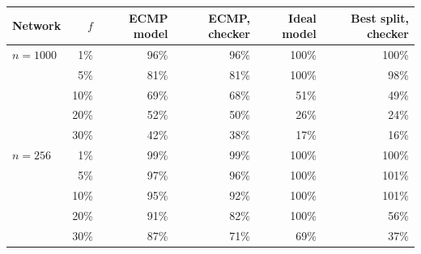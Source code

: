 \begin{tabular}{@{}lrrrrr@{}}
\toprule
Network & $f$ & ECMP model & ECMP, checker & Ideal model & Best split, checker \\
\midrule
$n = 1000$ & 1\% & 96\% & 96\% & 100\% & 100\% \\
 & 5\% & 81\% & 81\% & 100\% & 98\% \\
 & 10\% & 69\% & 68\% & 51\% & 49\% \\
 & 20\% & 52\% & 50\% & 26\% & 24\% \\
 & 30\% & 42\% & 38\% & 17\% & 16\% \\
\midrule
$n = 256$ & 1\% & 99\% & 99\% & 100\% & 100\% \\
 & 5\% & 97\% & 96\% & 100\% & 101\% \\
 & 10\% & 95\% & 92\% & 100\% & 101\% \\
 & 20\% & 91\% & 82\% & 100\% & 56\% \\
 & 30\% & 87\% & 71\% & 69\% & 37\% \\
\bottomrule
\end{tabular}
